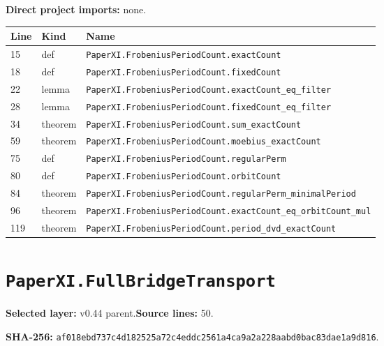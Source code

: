 \documentclass[10pt,oneside]{book}
\begin{document}

\textbf{Direct project imports:} none.

\begin{longtable}{@{}p{}p{}p{}@{}}\toprule Line&Kind&Name\\\midrule\endhead

15&def&\nolinkurl{PaperXI.FrobeniusPeriodCount.exactCount}\\

18&def&\nolinkurl{PaperXI.FrobeniusPeriodCount.fixedCount}\\

22&lemma&\nolinkurl{PaperXI.FrobeniusPeriodCount.exactCount_eq_filter}\\

28&lemma&\nolinkurl{PaperXI.FrobeniusPeriodCount.fixedCount_eq_filter}\\

34&theorem&\nolinkurl{PaperXI.FrobeniusPeriodCount.sum_exactCount}\\

59&theorem&\nolinkurl{PaperXI.FrobeniusPeriodCount.moebius_exactCount}\\

75&def&\nolinkurl{PaperXI.FrobeniusPeriodCount.regularPerm}\\

80&def&\nolinkurl{PaperXI.FrobeniusPeriodCount.orbitCount}\\

84&theorem&\nolinkurl{PaperXI.FrobeniusPeriodCount.regularPerm_minimalPeriod}\\

96&theorem&\nolinkurl{PaperXI.FrobeniusPeriodCount.exactCount_eq_orbitCount_mul}\\

119&theorem&\nolinkurl{PaperXI.FrobeniusPeriodCount.period_dvd_exactCount}\\

\bottomrule\end{longtable}

\section{\texorpdfstring{\nolinkurl{PaperXI.FullBridgeTransport}}{PaperXI.FullBridgeTransport}}\label{module:PaperXI.FullBridgeTransport}

\textbf{Selected layer:} v0.44 parent.\quad\textbf{Source lines:} 50.\par\textbf{SHA-256:} {\scriptsize\nolinkurl{af018ebd737c4d182525a72c4eddc2561a4ca9a2a228aabd0bac83dae1a9d816}}.
\end{document}

